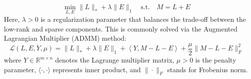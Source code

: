 \documentclass[runningheads]{llncs}
\begin{document}
\begin{equation}
    \min_{L, E} \|L\|_* + \lambda \|E\|_1 \quad \text{s.t.} \quad M = L + E \label{eq:RPCA-approx}
\end{equation}
Here, $\lambda > 0$ is a regularization parameter that balances the trade-off between the low-rank and sparse components.
This is commonly solved via the Augmented Lagrangian Multiplier (ADMM) method:
\begin{equation}
    \mathcal{L}(L, E, Y, \mu) = \|L\|_* + \lambda \|E\|_1 + \left\langle Y, M - L - E \right\rangle + \frac{\mu}{2} \|M - L - E\|_F^2 \label{eq:RPCA-lagrange}
\end{equation}
where $Y \in \mathbb{R}^{m \times n}$ denotes the Lagrange multiplier matrix, $\mu > 0$ is the penalty parameter, $\langle \cdot, \cdot \rangle$ represents inner product, and  $\|\cdot\|_F$ stands for Frobenius norm.
\end{document}
